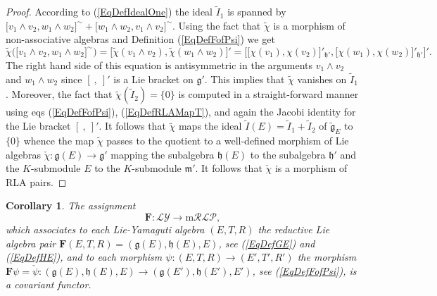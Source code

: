 \documentclass [11pt] {article}
\newtheorem {corollary} [lemma] {Corollary}
\theoremstyle{definition}
\begin{document}
\begin{proof}
    According to (\ref{EqDefIdealOne}) the ideal $\tilde{I}_1$ is spanned by
    $\big[v_1\wedge v_2, w_1\wedge w_2\big]^\sim
    +\big[w_1\wedge w_2, v_1\wedge v_2\big]^\sim$. Using the fact that $\tilde{\chi}$
    is a morphism of non-associative algebras and Definition (\ref{EqDefFofPsi}) we get
    \[
      \tilde{\chi}\Big(\big[v_1\wedge v_2, w_1\wedge w_2\big]^\sim\Big)
      =\big[\tilde{\chi}(v_1\wedge v_2),\tilde{\chi}(w_1\wedge w_2)\big]'
      =\Big[\big[\chi(v_1),\chi(v_2)\big]'_{\mathfrak{h}'},
         \big[\chi(w_1),\chi(w_2)\big]'_{\mathfrak{h}'}
            \Big]'.
    \]
    The right hand side of this equation is antisymmetric in the arguments
    $v_1\wedge v_2$ and $w_1\wedge w_2$ since $[~,~]'$ is a Lie bracket on $\mathfrak{g}'$. This implies that $\tilde{\chi}$ vanishes on $\tilde{I}_1$.
     Moreover, the fact that
     $\tilde{\chi}(\tilde{I}_2)=\{0\}$ is computed in a straight-forward manner using eqs (\ref{EqDefFofPsi}), (\ref{EqDefRLAMapT}), and again the Jacobi identity for the Lie bracket $[~,~]'$.
     It follows that $\tilde{\chi}$ maps the ideal $\tilde{I}(E)=\tilde{I}_1+\tilde{I}_2$
    of $\tilde{\mathfrak{g}}_{E}$ to $\{0\}$
    whence the map $\tilde{\chi}$ passes to the quotient to a well-defined morphism of Lie algebras
     $\check{\chi}:\mathfrak{g}(E)\to
    \mathfrak{g}'$ mapping the subalgebra
    $\mathfrak{h}(E)$ to the subalgebra $\mathfrak{h}'$
    and the $K$-submodule $E$ to the $K$-submodule $\mathfrak{m}'$.
    It follows that $\check{\chi}$ is a morphism of RLA pairs.
\end{proof}
\begin{corollary}\label{CDefFunctorF}
	The assignment 
	\begin{equation}\label{EqDefFunctorF}
		\mathbf{F}: \mathcal{LY} \longrightarrow  \mathrm{m}\mathcal{RLP},
	\end{equation}
	which associates to each Lie-Yamaguti algebra
	$(E,T,R)$ the reductive Lie algebra pair 
	$\mathbf{F}(E,T,R)=(\mathfrak{g}(E),\mathfrak{h}(E),E)$, 
	see (\ref{EqDefGE}) and (\ref{EqDefHE}), and to each
	morphism $\psi:(E,T,R)\to (E',T',R')$ the morphism
	$\mathbf{F}\psi=\check{\psi}:
	(\mathfrak{g}(E),\mathfrak{h}(E),E)\to
	(\mathfrak{g}(E'),\mathfrak{h}(E'),E')$, see
	 (\ref{EqDefFofPsi}), is a covariant functor.
\end{corollary}
\end{document}
